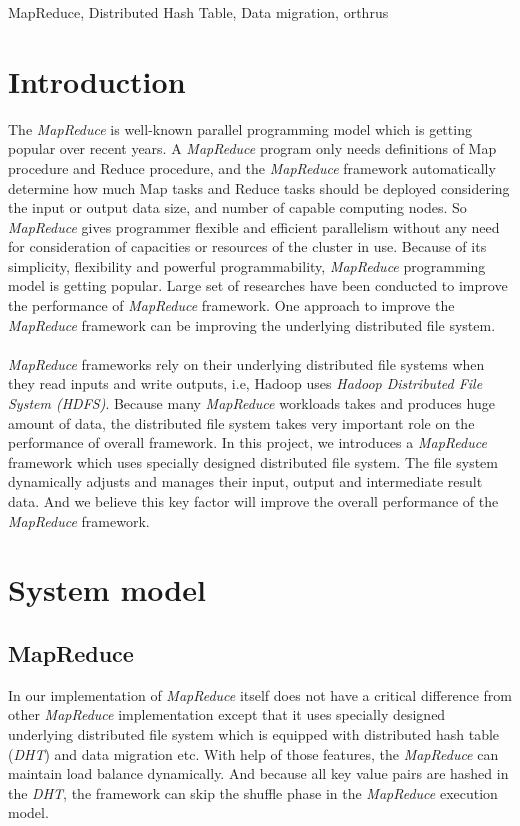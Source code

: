 \documentclass[nocopyrightspace]{sigplanconf}
\begin{document}


\keywords
MapReduce, Distributed Hash Table, Data migration, orthrus

\section*{Introduction}
The \textit{MapReduce} is well-known parallel programming model which is getting popular over recent years.
A \textit{MapReduce} program only needs definitions of Map procedure and Reduce procedure, 
and the \textit{MapReduce} framework automatically determine how much Map tasks and Reduce tasks should be 
deployed considering the input or output data size, and number of capable computing nodes.
So \textit{MapReduce} gives programmer flexible and efficient parallelism without any need for consideration of 
capacities or resources of the cluster in use.
Because of its simplicity, flexibility and powerful programmability, \textit{MapReduce} programming model is 
getting popular. Large set of researches have been conducted to improve the performance of \textit{MapReduce} framework.
One approach to improve the \textit{MapReduce} framework can be improving the underlying distributed file system. 
\\ \\
\textit{MapReduce} frameworks rely on their underlying distributed file systems when they read inputs and write outputs, 
i.e, Hadoop uses \textit{Hadoop Distributed File System (HDFS)}. 
Because many \textit{MapReduce} workloads takes and produces huge amount of data, 
the distributed file system takes very important role on the performance of overall framework. 
In this project, we introduces a \textit{MapReduce} framework which uses specially designed distributed file system.
The file system dynamically adjusts and manages their input, output and intermediate result data. 
And we believe this key factor will improve the overall performance of the \textit{MapReduce} framework.

\section*{System model}
\subsection*{MapReduce}
In our implementation of \textit{MapReduce} itself does not have a critical difference from other \textit{MapReduce}
implementation except that it uses specially designed underlying distributed file system which
is equipped with distributed hash table (\textit{DHT}) and data migration etc. With help of those features,
the \textit{MapReduce} can maintain load balance dynamically. And because all key value pairs are hashed
in the \textit{DHT}, the framework can skip the shuffle phase in the \textit{MapReduce} execution model. \\
\end{document}
